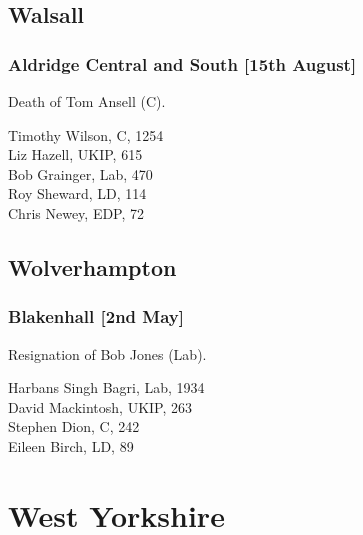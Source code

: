 \documentclass[a4paper,openany,10pt]{book}
\begin{document}
\subsection*{Walsall}

\subsubsection*{Aldridge Central and South \hspace*{\fill}\nolinebreak[1]%
\enspace\hspace*{\fill}
[15th August]}


Death of Tom Ansell (C).



Timothy Wilson, C, 1254\\
Liz Hazell, UKIP, 615\\
Bob Grainger, Lab, 470\\
Roy Sheward, LD, 114\\
Chris Newey, EDP, 72\\


\subsection*{Wolverhampton}

\subsubsection*{Blakenhall \hspace*{\fill}\nolinebreak[1]%
\enspace\hspace*{\fill}
[2nd May]}


Resignation of Bob Jones (Lab).



Harbans Singh Bagri, Lab, 1934\\
David Mackintosh, UKIP, 263\\
Stephen Dion, C, 242\\
Eileen Birch, LD, 89\\


\vfill

\section[West Yorkshire]{{West Yorkshire}}
\end{document}

